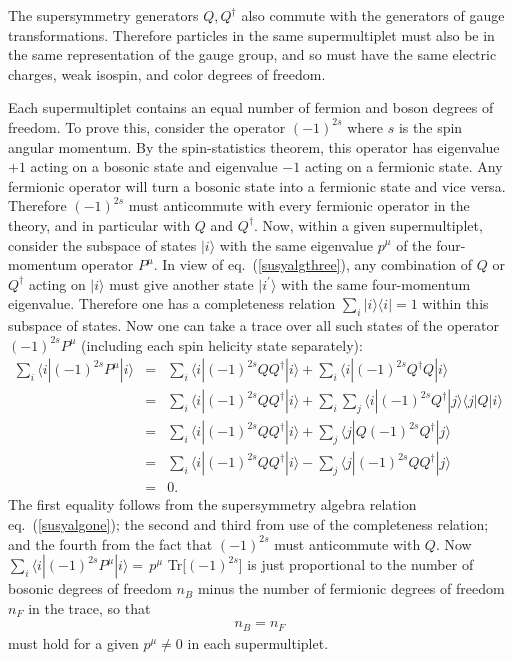 \documentclass[12pt]{article}
\def\beq{\begin{eqnarray}}
\def\eeq{\end{eqnarray}}
\begin{document}
The supersymmetry generators $Q,Q^\dagger$ also commute with the
generators of gauge transformations. Therefore particles in the same
supermultiplet must also be in the same representation of the gauge group,
and so must have the same electric charges, weak isospin, and color
degrees of freedom. 

Each supermultiplet contains an equal number of fermion and boson degrees
of freedom. To prove this, consider the operator $(-1)^{2s}$ where $s$ is
the spin angular momentum. By the spin-statistics theorem, this operator
has eigenvalue $+1$ acting on a bosonic state and eigenvalue $-1$ acting
on a fermionic state. Any fermionic operator will turn a bosonic state
into a fermionic state and vice versa. Therefore $(-1)^{2s}$ must
anticommute with every fermionic operator in the theory, and in particular
with $Q$ and $Q^\dagger$. Now, within a given supermultiplet, consider the
subspace of states $| i \rangle$ with the same eigenvalue $p^\mu$ of the
four-momentum operator $P^\mu$. In view of eq.~(\ref{susyalgthree}), any
combination of $Q$ or $Q^\dagger$ acting on $|i\rangle$ must give another
state $|i^\prime\rangle$ with the same four-momentum eigenvalue. Therefore
one has a completeness relation $\sum_i |i\rangle\langle i | = 1$ within
this subspace of states. Now one can take a trace over all such states of
the operator $(-1)^{2s} P^\mu$ (including each spin helicity state
separately): 
\beq
\sum_i \langle i | (-1)^{2s} P^\mu | i \rangle
&=&
\sum_i \langle i | (-1)^{2s} Q Q^\dagger|i\rangle
+\sum_i\langle i | (-1)^{2s} Q^\dagger Q | i \rangle
\nonumber\\
&=&
\sum_i \langle i | (-1)^{2s} Q Q^\dagger | i \rangle
+ \sum_i \sum_j \langle i | (-1)^{2s} Q^\dagger |j \rangle \langle j | Q
| i \rangle\qquad{}
\nonumber\\
&=&
\sum_i \langle i | (-1)^{2s} Q Q^\dagger | i \rangle +
\sum_j \langle j | Q (-1)^{2s}  Q^\dagger | j \rangle
\nonumber\\
&=&\sum_i \langle i | (-1)^{2s} Q Q^\dagger | i \rangle -
\sum_j \langle j |  (-1)^{2s} Q Q^\dagger | j \rangle
\nonumber \\
&=& 0.
\eeq
The first equality follows from the supersymmetry algebra relation
eq.~(\ref{susyalgone}); the second and third from use of the completeness
relation; and the fourth from the fact that $(-1)^{2s}$ must anticommute
with $Q$. Now $\sum_i \langle i | (-1)^{2s} P^\mu | i \rangle = \, p^\mu$
Tr[$(-1)^{2s}$] is just proportional to the number of bosonic degrees of
freedom $n_B$ minus the number of fermionic degrees of freedom $n_F$ in
the trace, so that
\beq
n_B= n_F
\label{nbnf}
\eeq
must hold for a given $p^\mu\not= 0$ in each supermultiplet.
\end{document}
